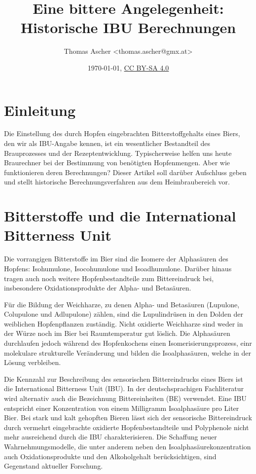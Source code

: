 \documentclass[a4paper,parskip=half]{scrartcl}
\title{Eine bittere Angelegenheit: Historische IBU Berechnungen}
\author{Thomas Ascher <thomas.ascher@gmx.at>}
\date{\today, \href{http://creativecommons.org/licenses/by-sa/4.0/}{CC BY-SA 4.0}}
\begin{document}
\maketitle

\section*{Einleitung}

Die Einstellung des durch Hopfen eingebrachten Bitterstoffgehalts eines Biers, den wir als IBU-Angabe kennen, ist ein wesentlicher Bestandteil des Brauprozesses und der Rezeptentwicklung. Typischerweise helfen uns heute Braurechner bei der Bestimmung von benötigten Hopfenmengen. Aber wie funktionieren deren Berechnungen? Dieser Artikel soll darüber Aufschluss geben und stellt historische Berechnungsverfahren aus dem Heimbraubereich vor.

\section*{Bitterstoffe und die International Bitterness Unit}

Die vorrangigen Bitterstoffe im Bier sind die Isomere der Alphasäuren des Hopfens: Isohumulone, Isocohumulone und Isoadhumulone. Darüber hinaus tragen auch noch weitere Hopfenbestandteile zum Bittereindruck bei, insbesondere Oxidationsprodukte der Alpha- und Betasäuren. \parencite{MEBAK2020}

Für die Bildung der Weichharze, zu denen Alpha- und Betasäuren (Lupulone, Colupulone und Adlupulone) zählen, sind die Lupulindrüsen in den Dolden der weiblichen Hopfenpflanzen zuständig. Nicht oxidierte Weichharze sind weder in der Würze noch im Bier bei Raumtemperatur gut löslich. Die Alphasäuren durchlaufen jedoch während des Hopfenkochens einen Isomerisierungsprozess, einr molekulare strukturelle Veränderung und bilden die Isoalphasäuren, welche in der Lösung verbleiben. \parencites{Hall1997}[20-23]{Nottebohm2020}

Die Kennzahl zur Beschreibung des sensorischen Bittereindrucks eines Biers ist die International Bitterness Unit (IBU). In der deutschsprachigen Fachliteratur wird alternativ auch die Bezeichnung Bittereinheiten (BE) verwendet. Eine IBU entspricht einer Konzentration von einem Milligramm Isoalphasäure pro Liter Bier. Bei stark und kalt gehopften Bieren lässt sich der sensorische Bittereindruck durch vermehrt eingebrachte oxidierte Hopfenbestandteile und Polyphenole nicht mehr ausreichend durch die IBU charakterisieren. Die Schaffung neuer Wahrnehmungsmodelle, die unter anderem neben den Isoalphasäurekonzentration auch Oxidationsprodukte und den Alkoholgehalt berücksichtigen, sind Gegenstand aktueller Forschung. \parencite{Kishimoto2021}
\end{document}
